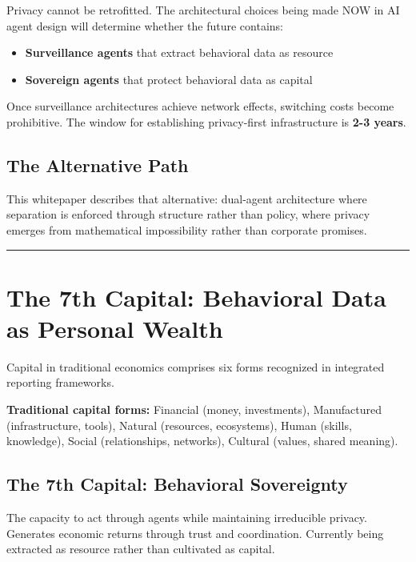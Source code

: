 \documentclass[
]{article}
\providecommand{\tightlist}{%
  \setlength{\itemsep}{0pt}\setlength{\parskip}{0pt}}
\begin{document}
Privacy cannot be retrofitted. The architectural choices being made NOW
in AI agent design will determine whether the future contains:

\begin{itemize}
\tightlist
\item
  \textbf{Surveillance agents} that extract behavioral data as resource
\item
  \textbf{Sovereign agents} that protect behavioral data as capital
\end{itemize}

Once surveillance architectures achieve network effects, switching costs
become prohibitive. The window for establishing privacy-first
infrastructure is \textbf{2-3 years}.

\subsection{The Alternative Path}\label{the-alternative-path}

This whitepaper describes that alternative: dual-agent architecture
where separation is enforced through structure rather than policy, where
privacy emerges from mathematical impossibility rather than corporate
promises.

\begin{center}\rule{0.5\linewidth}{0.5pt}\end{center}

\section{The 7th Capital: Behavioral Data as Personal
Wealth}\label{the-7th-capital-behavioral-data-as-personal-wealth}

Capital in traditional economics comprises six forms recognized in
integrated reporting frameworks.

\textbf{Traditional capital forms:} Financial (money, investments),
Manufactured (infrastructure, tools), Natural (resources, ecosystems),
Human (skills, knowledge), Social (relationships, networks), Cultural
(values, shared meaning).

\subsection{The 7th Capital: Behavioral
Sovereignty}\label{the-7th-capital-behavioral-sovereignty}

The capacity to act through agents while maintaining irreducible
privacy. Generates economic returns through trust and coordination.
Currently being extracted as resource rather than cultivated as capital.
\end{document}
